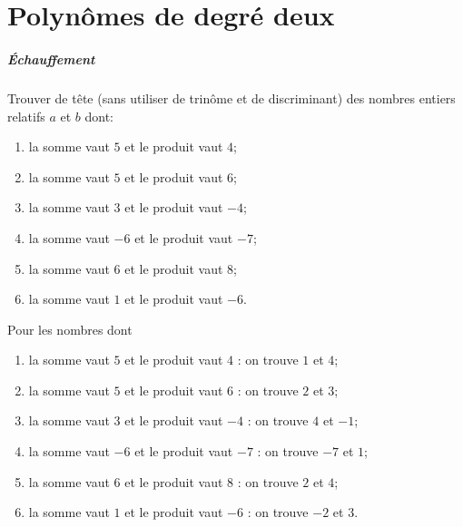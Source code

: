 
\chapter{Polynômes de degré deux}


\paragraph{Échauffement}

\begin{exo}
Trouver de tête (sans utiliser de trinôme et de discriminant) des nombres entiers relatifs $a$ et $b$ dont:
\begin{multicols}{2}
\begin{enumerate}
\item la somme vaut $5$ et le produit vaut $4$;
\item la somme vaut $5$ et le produit vaut $6$;
\item la somme vaut $3$ et le produit vaut $-4$;
\item la somme vaut $-6$ et le produit vaut $-7$;
\item la somme vaut $6$ et le produit vaut $8$;
\item la somme vaut $1$ et le produit vaut $-6$.
\end{enumerate}
\end{multicols}
\begin{sol}
Pour les nombres dont
\begin{enumerate}
\item la somme vaut $5$ et le produit vaut $4$ : on trouve $1$ et $4$;
\item la somme vaut $5$ et le produit vaut $6$ : on trouve $2$ et $3$;
\item la somme vaut $3$ et le produit vaut $-4$ : on trouve $4$ et $-1$;
\item la somme vaut $-6$ et le produit vaut $-7$ : on trouve $-7$ et $1$;
\item la somme vaut $6$ et le produit vaut $8$ : on trouve $2$ et $4$;
\item la somme vaut $1$ et le produit vaut $-6$ : on trouve $-2$ et $3$.
\end{enumerate}
\end{sol}
\end{exo}



